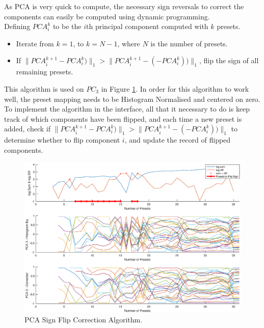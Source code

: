 \documentclass[11pt, oneside]{report}   	%
\begin{document}
As PCA is very quick to compute, the necessary sign reversals to correct the components can easily be computed using dynamic programming.\\ Defining $PCA_i^k$ to be the $i$th principal component computed with $k$ presets.
\begin{itemize}
	\vspace{-10pt}
		\setlength\itemsep{-1.2em}
	\item 
Iterate from $k = 1$, to $k = N-1$, where $N$ is the number of presets.
	\item 
If $\|PCA_i^{k+1} - PCA_i^k)\|_1 > \|PCA_i^{k+1} - (-PCA_i^k))\|_1$,  flip the sign of all remaining presets.
\vspace{-30pt}
\end{itemize}
This algorithm is used on $PC_3$ in Figure \ref{fig:PCAnumPresets2}. In order for this algorithm to work well, the preset mapping needs to be Histogram Normalised and centered on zero. To implement the algorithm in the interface, all that it necessary to do is keep track of which components have been flipped, and each time a new preset is added, check if $\|PCA_i^{k+1} - PCA_i^k)\|_1 > \|PCA_i^{k+1} - (-PCA_i^k))\|_1$ to determine whether to flip component $i$, and update the record of flipped components. 

\begin{figure}
	\hspace{-40pt}
	\includegraphics[trim={0, 1cm, 0, 1.5cm}, clip, width = 7in]{PCAnumPresets2.eps}
	\caption{PCA Sign Flip Correction Algorithm.}
	\label{fig:PCAnumPresets2}
	\vspace{-10pt}
\end{figure}
\end{document}
